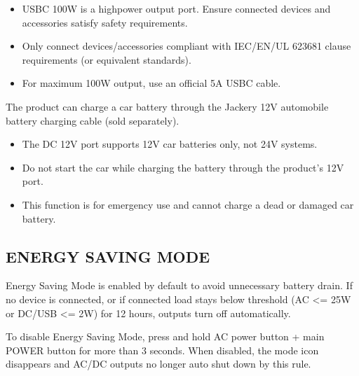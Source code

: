\documentclass[a4paper,10pt,twoside,openany,english]{sphinxhowto}
\let\sphinxpxdimen\pdfpxdimen\else\newdimen\sphinxpxdimen
\begin{document}
\sphinxAtStartPar
{}
\begin{itemize}
\item {} 
\sphinxAtStartPar
USB\sphinxhyphen{}C 100W is a high\sphinxhyphen{}power output port. Ensure connected devices and accessories satisfy safety requirements.

\item {} 
\sphinxAtStartPar
Only connect devices/accessories compliant with IEC/EN/UL 62368\sphinxhyphen{}1 clause requirements (or equivalent standards).

\item {} 
\sphinxAtStartPar
For maximum 100W output, use an official 5A USB\sphinxhyphen{}C cable.

\end{itemize}

\sphinxAtStartPar
The product can charge a car battery through the Jackery 12V automobile battery charging cable (sold separately).

\sphinxAtStartPar
{}
\begin{itemize}
\item {} 
\sphinxAtStartPar
The DC 12V port supports 12V car batteries only, not 24V systems.

\item {} 
\sphinxAtStartPar
Do not start the car while charging the battery through the product’s 12V port.

\item {} 
\sphinxAtStartPar
This function is for emergency use and cannot charge a dead or damaged car battery.

\end{itemize}


\subsection{ENERGY SAVING MODE}
\label{\detokenize{index:energy-saving-mode}}
\sphinxAtStartPar
Energy Saving Mode is enabled by default to avoid unnecessary battery drain.
If no device is connected, or if connected load stays below threshold
(AC <= 25W or DC/USB <= 2W) for 12 hours, outputs turn off automatically.

\sphinxAtStartPar
To disable Energy Saving Mode, press and hold AC power button + main POWER button for more than 3 seconds.
When disabled, the mode icon disappears and AC/DC outputs no longer auto shut down by this rule.

\noindent\sphinxincludegraphics[width=320\sphinxpxdimen]{{fig}.png}
\end{document}
